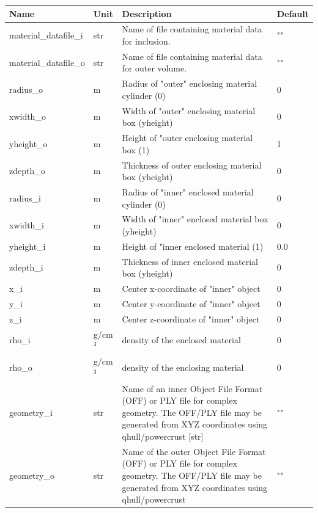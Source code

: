 \begin{longtable}{p{}p{}p{}p{}}
\toprule
\textbf{Name} & \textbf{Unit} & \textbf{Description} & \textbf{Default} \\
\midrule
\endhead
material\_datafile\_i & str & Name of file containing material data for inclusion. & "" \\
material\_datafile\_o & str & Name of file containing material data for outer volume. & "" \\
radius\_o & m & Radius of "outer" enclosing material cylinder (0) & 0 \\
xwidth\_o & m & Width of "outer" enclosing material box (yheight) & 0 \\
yheight\_o & m & Height of "outer enclosing material box (1) & 1 \\
zdepth\_o & m & Thickness of outer enclosing material box (yheight) & 0 \\
radius\_i & m & Radius of "inner" enclosed material cylinder (0) & 0 \\
xwidth\_i & m & Width of "inner" enclosed material box (yheight) & 0 \\
yheight\_i & m & Height of "inner enclosed material (1) & 0.0 \\
zdepth\_i & m & Thickness of inner enclosed material box (yheight) & 0 \\
x\_i & m & Center x-coordinate of "inner" object & 0 \\
y\_i & m & Center y-coordinate of "inner" object & 0 \\
z\_i & m & Center z-coordinate of "inner" object & 0 \\
rho\_i & g/cm$^{3}$ & density of the enclosed material & 0 \\
rho\_o & g/cm$^{3}$ & density of the enclosing material & 0 \\
geometry\_i & str & Name of an inner Object File Format (OFF) or PLY file for complex geometry. The OFF/PLY file may be generated from XYZ coordinates using qhull/powercrust [str] & "" \\
geometry\_o & str & Name of the outer Object File Format (OFF) or PLY file for complex geometry. The OFF/PLY file may be generated from XYZ coordinates using qhull/powercrust & "" \\
\bottomrule
\end{longtable}

